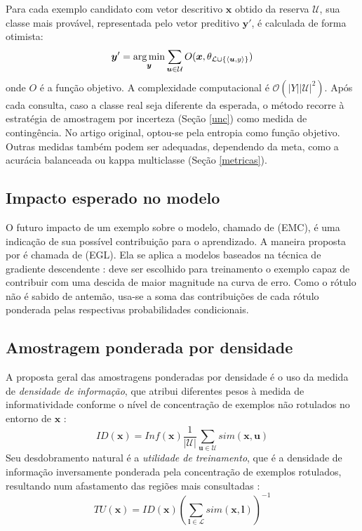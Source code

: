 Para cada exemplo candidato com vetor descritivo $\bm{x}$
obtido da reserva $\mathcal{U}$,
sua classe mais provável,
representada pelo vetor preditivo $\bm{y}'$, é calculada de forma
otimista:
\begin{equation}
 \bm{y}' = \operatorname*{arg\,min}_{\bm{y}}{\sum_{\bm{u} \in \mathcal{U}} O(\bm{x}, \theta_{\mathcal{L}\cup
\{\langle\bm{u},y\rangle\}})}
\end{equation}
onde $O$ é a função objetivo.
A complexidade computacional é $\mathcal{O}(|Y||\mathcal{U}|^2)$.
Após cada consulta, caso a classe real seja diferente da esperada,
o método recorre à estratégia de amostragem por incerteza (Seção \ref{unc})
como medida de contingência.
No artigo original, optou-se pela entropia como função objetivo.
Outras medidas também podem ser adequadas, dependendo da meta,
como a acurácia balanceada ou kappa multiclasse (Seção \ref{metricas}).

\subsection{Impacto esperado no modelo}
O futuro impacto de um exemplo sobre o modelo,
chamado de  (EMC),
é uma indicação de sua possível contribuição para o aprendizado.
A maneira proposta por \cite{conf/nips/SettlesCR07} é chamada
de  (EGL).
Ela se aplica a modelos baseados na técnica de gradiente descendente \citep{haykin2004comprehensive}:
deve ser escolhido para treinamento o exemplo capaz de contribuir com uma descida de maior magnitude
na curva de erro.
Como o rótulo não é sabido de antemão,
usa-se a soma das contribuições de cada rótulo ponderada pelas respectivas probabilidades condicionais.


\subsection{Amostragem ponderada por densidade}\label{dw}
A proposta geral das amostragens ponderadas por densidade é o uso da medida de
\textit{densidade de informação}, que atribui diferentes pesos à medida de
informatividade conforme o nível de concentração de exemplos não rotulados no entorno de $\bm{x}$
\citep{settles2008curious}:
\begin{equation}\label{eqid}
 ID(\bm{x}) = Inf(\bm{x})\frac{1}{|\mathcal{U}|} \sum_{\bm{u} \in \mathcal{U}} sim(\bm{x},\bm{u})
\end{equation}
Seu desdobramento natural é a \textit{utilidade de treinamento},
que é a densidade de informação inversamente ponderada pela concentração de exemplos rotulados,
resultando num afastamento das regiões mais consultadas
\citep{journals/coling/FujiiITT98}:
\begin{equation}\label{eqtu}
 TU(\bm{x}) = ID(\bm{x}) (\sum_{\bm{l} \in \mathcal{L}} sim(\bm{x},\bm{l}))^{-1}
\end{equation}



